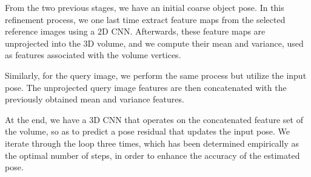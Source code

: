 \bigskip

From the two previous stages, we have an initial coarse object pose. 
In this refinement process, we one last time extract feature maps from the selected reference images using a 2D \ac{CNN}. Afterwards, these feature maps are unprojected into the 3D volume, and we compute their mean and variance, used as features associated with the volume vertices.

Similarly, for the query image, we perform the same process but utilize the input pose. The unprojected query image features are then concatenated with the previously obtained mean and variance features.

At the end, we have a 3D \ac{CNN} that operates on the concatenated feature set of the volume, so as to predict a pose residual that updates the input pose. We iterate through the loop three times, which has been determined empirically as the optimal number of steps, in order to enhance the accuracy of the estimated pose.

